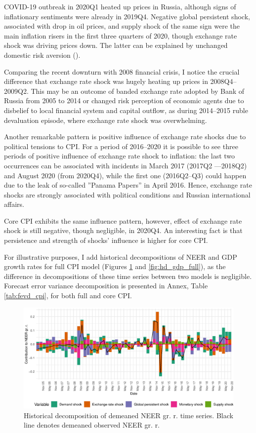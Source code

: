 \documentclass[12pt, a4paper]{extarticle}
\begin{document}
COVID-19 outbreak in 2020Q1 heated up prices in Russia, although signs of inflationary sentiments were already in 2019Q4. Negative global persistent shock, associated with drop in oil prices, and supply shock of the same sign were the main inflation risers in the first three quarters of 2020, though exchange rate shock was driving prices down. The latter can be explained by unchanged domestic risk aversion (\cite[p. 258]{Forbes2018}).

Comparing the recent downturn with 2008 financial crisis, I notice the crucial difference that exchange rate shock was hugely heating up prices in 2008Q4--2009Q2. This may be an outcome of banded exchange rate adopted by Bank of Russia from 2005 to 2014 or changed risk perception of economic agents due to disbelief to local financial system and capital outflow, as during 2014--2015 ruble devaluation episode, where exchange rate shock was overwhelming.

Another remarkable pattern is positive influence of exchange rate shocks due to political tensions to CPI. For a period of 2016--2020 it is possible to see three periods of positive influence of exchange rate shock to inflation: the last two occurrences can be associated with incidents in March 2017 (2017Q2 ---2018Q2) and August 2020 (from 2020Q4), while the first one (2016Q2--Q3) could happen due to the leak of so-called ''Panama Papers'' in April 2016. Hence, exchange rate shocks are strongly associated with political conditions and Russian international affairs.

Core CPI exhibits the same influence pattern, however, effect of exchange rate shock is still negative, though negligible, in 2020Q4. An interesting fact is that persistence and strength of shocks' influence is higher for core CPI. 

For illustrative purposes, I add historical decompositions of NEER and GDP growth rates for full CPI model (Figures \ref{fig:hd_neer_full} and \ref{fig:hd_gdp_full}), as the difference in decompositions of these time series between two models is negligible. Forecast error variance decomposition is presented in Annex, Table \ref{tab:fevd_cpi}, for both full and core CPI.

\begin{figure}[h!]
	\centering
	\includegraphics[width=0.95\linewidth]{figures/hd_exrate_full}
	\caption[]{Historical decomposition of demeaned NEER gr. r. time series. Black line denotes demeaned observed NEER gr. r.}
	\label{fig:hd_neer_full}
\end{figure}
\end{document}
